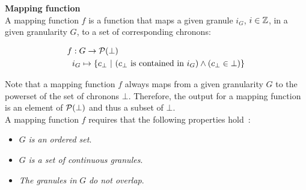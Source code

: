 \begin{svgraybox}
\vspace{-10pt}
\begin{definition}
\label{def:mapping-function}
\textbf{Mapping function}~\cite{Lin97}\\ 
A mapping function $f$ is a function that maps a given granule $i_G$, $i \in \mathbb{Z}$, in a given granularity $G$, to a set of corresponding chronons:\\

\vspace{-10pt}

\begin{align}
f & : G \rightarrow \mathcal{P}(\bot)\nonumber\\
  &  i_{G} \mapsto \lbrace c_\bot\ |\ (c_\bot\text{ is contained in }i_{G}) \wedge (c_\bot \in \bot)\rbrace\nonumber
\end{align}
\end{definition}
\vspace{-10pt}
\end{svgraybox}

Note that a mapping function $f$ always maps from a given granularity $G$ to the powerset of the set of chronons $\bot$. Therefore, the output for a mapping function is an element of $\mathcal{P}(\bot)$ and thus a subset of $\bot$. \\
 A mapping function $f$ requires that the following properties hold~\cite{Lin97}:
 
 \begin{itemize}
 \item
 $G$ \emph{is an ordered set}.
 \item
 $G$ \emph{is a set of continuous granules}.
 \item
 \emph{The granules in} $G$ \emph{do not overlap}.
 \end{itemize}

